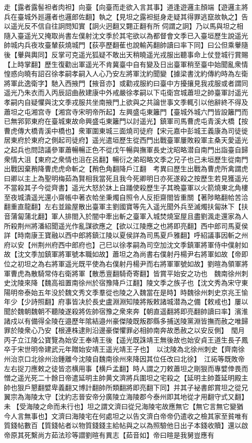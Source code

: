 走【露者露髻袒者肉袒】向臺【向臺而走欲入言其事】道逢遊邏主顏端【遊邏主將兵在臺城外廵邏者也邏郎佐翻】執之【見坦之露袒挺身走疑其得罪逃竄故執之】告以遥光反不信自往詗問知實【詗火迥翻又翾正翻有所伺謂之詗】乃以馬與坦之相隨入臺遥光又掩取尚書左僕射沈文季於其宅欲以為都督會文季已入臺垣歷生說遥光帥城内兵夜攻臺輦荻燒城門【荻亭歷翻萑也說輸芮翻帥讀曰率下同】曰公但乘轝隨後【轝與輿同】反掌可克遥光狐疑不敢出天稍曉遥光戎服出聽事命上仗登城行賞賜【上時掌翻】歷生復勸出軍遥光不肯冀臺中自有變及日出臺軍稍至臺中始聞亂衆情惶惑向曉有詔召徐孝嗣孝嗣入人心乃安左將軍沈約聞變【據梁書沈約傳約時為左衛將軍此逸衛字】馳入西掖門【掖音亦】或勸戎服約曰臺中方擾攘見我戎服或者謂同遥光乃朱衣而入丙辰詔曲赦建康中外戒嚴徐孝嗣以下屯衛宫城蕭坦之帥臺軍討遥光孝嗣内自疑懼與沈文季戎服共坐南掖門上欲與之共論世事文季輒引以他辭終不得及蕭坦之屯湘宫寺【湘宫寺宋明帝所起】左興盛屯東籬門【臺城外城六門皆設籬門而已無郛郭東府在臺城東故命興盛屯東籬門以討遥光】鎮軍司馬曹虎屯青溪大橋【按曹虎傳大橋青溪中橋也】衆軍圍東城三面燒司徒府【宋元嘉中彭城王義康為司徒徙居東府於東府之側起司徒府】遥光遣垣歷生從西門出戰臺軍屢敗殺軍主桑天愛遥光之起兵也問諮議參軍蕭暢暢正色不從戊午暢與撫軍長史沈昭略潜自南門出詣臺自歸衆情大沮【東府之衆情也沮在呂翻】暢衍之弟昭略文季之兄子也己未垣歷生從南門出戰因棄矟降曹虎虎命斬之【矟色角翻降戶江翻　考異曰歷生出戰為曹虎所禽謂虎曰卿以主上為聖明梅茹為賢相我當死且我今死卿明日亦死遂殺之按歷生若見獲遥光不當殺其子今從齊書】遥光大怒於牀上自踊使殺歷生子其晩臺軍以火箭燒東北角樓至夜城潰遥光還小齋帳中著衣帢坐秉燭自照令人反拒齋閤皆重關【著陟略翻帢苦洽翻重直龍翻】左右並踰屋散出臺軍主劉國寶等先入遥光聞外兵至滅燭扶匐牀下【扶音蒲匐蒲北翻】軍人排閤入於闇中牽出斬之臺軍入城焚燒室屋且盡劉渢走還家為人所殺荆州將潘紹聞遥光作亂謀欲應之【欲以江陵應之也將即亮翻】西中郎司馬夏侯詳【時南康王寶融以西中郎將鎮江陵以夏侯詳為司馬夏戶雅翻】呼紹議事因斬之州府以安【州荆州府西中郎府也】己巳以徐孝嗣為司空加沈文季鎮軍將軍侍中僕射如故【沈文季加鎮軍將軍號本職如故】蕭坦之為尚書右僕射丹楊尹右將軍如故【帝即位之初坦之為右將軍遥光既平使為右僕射丹楊尹而右將軍軍號如故】劉暄為領軍將軍曹虎為散騎常侍右衛將軍【散悉亶翻騎奇寄翻】皆賞平始安之功也　魏南徐州刺史沈陵來降【魏高祖置南徐州於宿豫降戶江翻】陵文季之族子也【沈文秀為宋守東陽明帝泰始五年没於魏文秀文季羣從也陵之入魏當在是時】時魏徐州刺史京兆王愉年少【少詩照翻】府事皆决於長史盧淵淵知陵將叛敕諸城潜為之備【敕戒也】屢以聞於魏朝魏朝不聽陵遂殺將佐帥宿豫之衆來奔【朝直遥翻將即亮翻帥讀曰率】濱淮諸戍以有備得全陵在邉歷年隂結邉州豪傑陵既叛郡縣多捕送陵黨淵皆撫而赦之唯歸罪於陵衆心乃安【根連株逮則沿邊豪傑懼罪必相帥南奔故悉赦之以安反側】　閠月丙子立江陵公寶覽為始安王奉靖王後【遥光既誅靖王無後故也始安貞王道生長子鳳卒于宋世明帝建武元年贈始安靖王遥光靖王子也】　以沈陵為北徐州刺史【齊南徐州治京口北徐州治鍾離今沈陵自魏南徐州來降因其位任改曰北徐】　江祏等既敗帝左右捉刀應敕之徒皆恣横用事【横戶孟翻】時人謂之刀敕蕭坦之剛狠而專嬖倖畏而憎之遥光死二十餘日帝遣延明主帥黄文濟將兵圍坦之宅殺之【延明主帥蓋延明殿主帥也狠戶懇翻嬖卑義翻又博計翻帥所類翻將即亮翻下同】并其子袐書郎賞坦之從兄翼宗為海陵太守【沈約志晉安帝分廣陵立海陵郡今泰州即其地從才用翻守式又翻】未【受海陵之命而未行也】坦之謂文濟曰從兄海陵宅故應無它【無它言無它變猶今人言無事也】文濟曰海陵宅在何處坦之以告文濟白帝帝仍遣收之檢其家至貧唯有質錢帖數百【質錢帖者以物質錢錢主給帖與之以為照驗他日出子本錢收贖】還以啟帝原其死繫尚方茹法珍等譛劉暄有異志【茹音如】帝曰暄是我舅豈應有